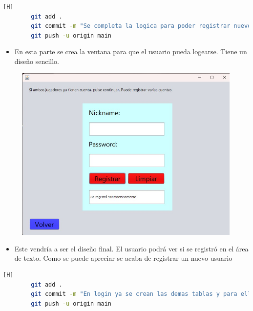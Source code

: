 \documentclass{article}
\begin{document}
	
	
	\begin{lstlisting}[language=bash,caption={Commit: 8b752b0993f8facea77c5b3a97a7856e0e6e73ed }][H]
		git add .
		git commit -m "Se completa la logica para poder registrar nuevos jugadores"			
		git push -u origin main
	\end{lstlisting}
	
	\begin{itemize}	
	\item En esta parte se crea la ventana para que el usuario pueda logearse. Tiene un diseño sencillo.
	\end{itemize}
	
		\begin{figure}[H]
		\centering
		\includegraphics[width=1\textwidth,keepaspectratio]{img/login.jpg}
	\end{figure}
	
	\begin{itemize}	
		\item Este vendría a ser el diseño final. El usuario podrá ver si se registró en el área de texto. Como se puede apreciar se acaba de registrar un nuevo usuario
	\end{itemize}
	
	
	
	\begin{lstlisting}[language=bash,caption={Commit: ad82e8abf5a8c58897d2ac6b10c4959f81e56965 }][H]
		git add .
		git commit -m "En login ya se crean las demas tablas y para ello se modifica la clase Conectarr"			
		git push -u origin main
	\end{lstlisting}
	
\end{document}

